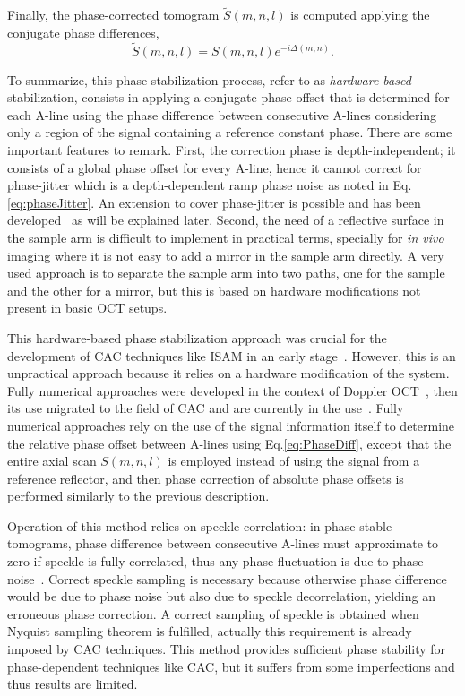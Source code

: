 Finally, the phase-corrected tomogram $\tilde{S}(m,n,l)$ is computed applying the conjugate phase differences,
\begin{equation}
	\tilde{S}(m,n,l) = S(m,n,l)e^{-i\Delta(m,n)}.
\end{equation}

To summarize, this phase stabilization process, refer to as \textit{hardware-based} stabilization, consists in applying a conjugate phase offset that is determined for each A-line using the phase difference between consecutive A-lines considering only a region of the signal containing a reference constant phase. There are some important features to remark. First, the correction phase is depth-independent; it consists of a global phase offset for every A-line, hence it cannot correct for phase-jitter which is a depth-dependent ramp phase noise as noted in Eq.\eqref{eq:phaseJitter}. An extension to cover phase-jitter is possible and has been developed~\cite{Vakoc2005_Phaseresolved} as will be explained later. Second, the need of a reflective surface in the sample arm is difficult to implement in practical terms, specially for \textit{in vivo} imaging where it is not easy to add a mirror in the sample arm directly. A very used approach is to separate the sample arm into two paths, one for the sample and the other for a mirror, but this is based on hardware modifications not present in basic OCT setups. 

This hardware-based phase stabilization approach was crucial for the development of CAC techniques like ISAM in an early stage~\cite{Ralston2006_Phase}. However, this is an unpractical approach because it relies on a hardware modification of the system. Fully numerical approaches were developed in the context of Doppler OCT~\cite{White2003_vivo}, then its use migrated to the field of CAC and are currently in the use~\cite{Shemonski2014_Threedimensional}. Fully numerical approaches rely on the use of the signal information itself to determine the relative phase offset between A-lines using Eq.\eqref{eq:PhaseDiff}, except that the entire axial scan $S(m,n,l)$ is employed instead of using the signal from a reference reflector, and then phase correction of absolute phase offsets is performed similarly to the previous description.

Operation of this method relies on speckle correlation: in phase-stable tomograms, phase difference between consecutive A-lines must approximate to zero if speckle is fully correlated, thus any phase fluctuation is due to phase noise~\cite{White2003_vivo}. Correct speckle sampling is necessary because otherwise phase difference would be due to phase noise but also due to speckle decorrelation, yielding an erroneous phase correction. A correct sampling of speckle is obtained when Nyquist sampling theorem is fulfilled, actually this requirement is already imposed by CAC techniques. This method provides sufficient phase stability for phase-dependent techniques like CAC, but it suffers from some imperfections and thus results are limited.

